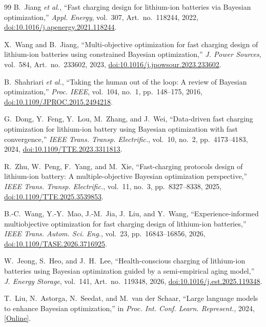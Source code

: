 \begin{thebibliography}{99}
B.~Jiang \textit{et al.}, ``Fast charging design for lithium-ion batteries via
Bayesian optimization,'' \textit{Appl. Energy}, vol.~307,
Art.~no.~118244, 2022,
\href{https://doi.org/10.1016/j.apenergy.2021.118244}
{doi:10.1016/j.apenergy.2021.118244}.

X.~Wang and B.~Jiang, ``Multi-objective optimization for fast charging design
of lithium-ion batteries using constrained Bayesian optimization,''
\textit{J. Power Sources}, vol.~584, Art.~no.~233602, 2023,
\href{https://doi.org/10.1016/j.jpowsour.2023.233602}
{doi:10.1016/j.jpowsour.2023.233602}.

B.~Shahriari \textit{et al.}, ``Taking the human out of the loop: A review of
Bayesian optimization,'' \textit{Proc. IEEE}, vol.~104, no.~1, pp.~148--175,
2016,
\href{https://doi.org/10.1109/JPROC.2015.2494218}
{doi:10.1109/JPROC.2015.2494218}.

G.~Dong, Y.~Feng, Y.~Lou, M.~Zhang, and J.~Wei, ``Data-driven fast charging
optimization for lithium-ion battery using Bayesian optimization with fast
convergence,'' \textit{IEEE Trans. Transp. Electrific.}, vol.~10, no.~2,
pp.~4173--4183, 2024,
\href{https://doi.org/10.1109/TTE.2023.3311813}
{doi:10.1109/TTE.2023.3311813}.

R.~Zhu, W.~Peng, F.~Yang, and M.~Xie, ``Fast-charging protocols design of
lithium-ion battery: A multiple-objective Bayesian optimization perspective,''
\textit{IEEE Trans. Transp. Electrific.}, vol.~11, no.~3,
pp.~8327--8338, 2025,
\href{https://doi.org/10.1109/TTE.2025.3539853}
{doi:10.1109/TTE.2025.3539853}.

B.-C.~Wang, Y.-Y.~Mao, J.-M.~Jia, J.~Liu, and Y.~Wang, ``Experience-informed
multiobjective optimization for fast charging design of lithium-ion
batteries,'' \textit{IEEE Trans. Autom. Sci. Eng.}, vol.~23,
pp.~16843--16856, 2026,
\href{https://doi.org/10.1109/TASE.2026.3716925}
{doi:10.1109/TASE.2026.3716925}.

W.~Jeong, S.~Heo, and J.~H.~Lee, ``Health-conscious charging of lithium-ion
batteries using Bayesian optimization guided by a semi-empirical aging
model,'' \textit{J. Energy Storage}, vol.~141, Art.~no.~119348, 2026,
\href{https://doi.org/10.1016/j.est.2025.119348}
{doi:10.1016/j.est.2025.119348}.

T.~Liu, N.~Astorga, N.~Seedat, and M.~van der Schaar, ``Large language models
to enhance Bayesian optimization,'' in \textit{Proc. Int. Conf. Learn.
Represent.}, 2024,
\href{https://openreview.net/forum?id=OOxotBmGol}{[Online]}.


\end{thebibliography}
